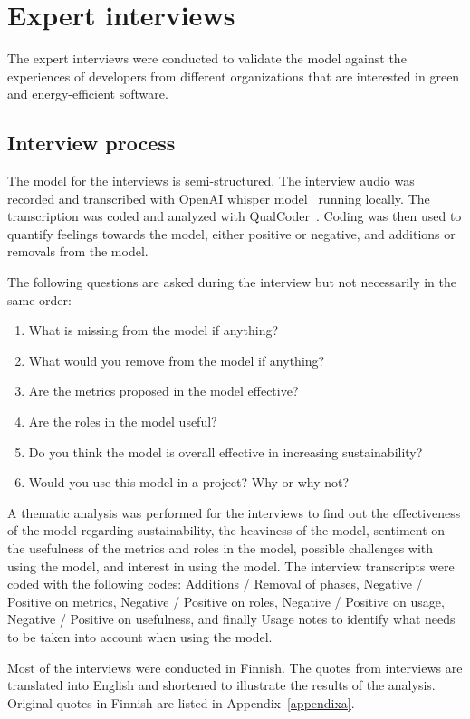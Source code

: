 \section{Expert interviews}\label{expertinterviews}
The expert interviews were conducted to validate the model against the experiences of developers from different organizations that are interested in green and energy-efficient software.

\subsection{Interview process}
 The model for the interviews is semi-structured. The interview audio was recorded and transcribed with OpenAI whisper model~\cite{whisper} running locally. The transcription was coded and analyzed with QualCoder~\cite{qualcoder}. Coding was then used to quantify feelings towards the model, either positive or negative, and additions or removals from the model.

The following questions are asked during the interview but not necessarily in the same order:

\begin{enumerate}
    \item What is missing from the model if anything?
    \item What would you remove from the model if anything?
    \item Are the metrics proposed in the model effective?
    \item Are the roles in the model useful?
    \item Do you think the model is overall effective in increasing sustainability?
    \item Would you use this model in a project? Why or why not?
\end{enumerate}
    
A thematic analysis was performed for the interviews to find out the effectiveness of the model regarding sustainability, the heaviness of the model, sentiment on the usefulness of the metrics and roles in the model, possible challenges with using the model, and interest in using the model. The interview transcripts were coded with the following codes: Additions / Removal of phases, Negative / Positive on metrics, Negative / Positive on roles, Negative / Positive on usage, Negative / Positive on usefulness, and finally Usage notes to identify what needs to be taken into account when using the model.

Most of the interviews were conducted in Finnish. The quotes from interviews are translated into English and shortened to illustrate the results of the analysis. Original quotes in Finnish are listed in Appendix~\ref{appendixa}.

